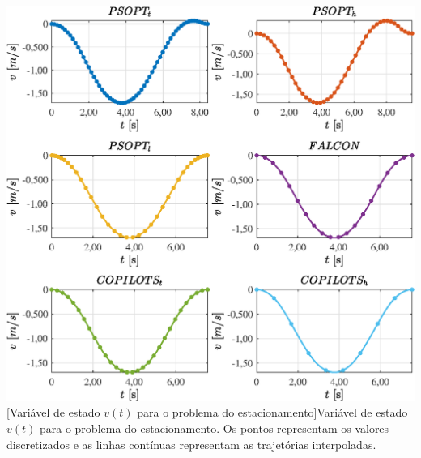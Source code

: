 \noindent
\begin{minipage}{\textwidth}
	\vspace{\onelineskip}
	\centering
	\includegraphics[scale=0.7]{fig/resultados/estacionamento/traj/x/v}
	[Variável de estado $v(t)$ para o problema do estacionamento]{Variável de estado $v(t)$ para o problema do estacionamento. Os pontos representam os valores discretizados e as linhas contínuas representam as trajetórias interpoladas.}
	\label{fig:estacionamento:x:v}
	\vspace{\onelineskip}
\end{minipage}

